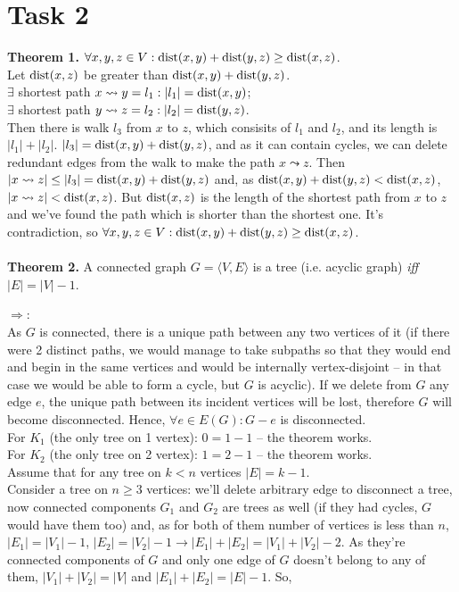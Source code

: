 \documentclass{article}
\begin{document}
	\section*{Task 2}
	\textbf{Theorem 1.} $\forall x,y,z \in  V: \textmd{dist}(x,y)+ \textmd{dist}(y,z) \geq \textmd{dist}(x,z)$.\\
	Let $\textmd{dist}(x,z)$ be greater than $\textmd{dist}(x,y) + \textmd{dist}(y,z)$.\\
	$\exists $ shortest path $x \leadsto y = l_1 : |l_1| = \textmd{dist}(x,y)$;\\
	$\exists $ shortest path $y \leadsto z = l_2: |l_2| = \textmd{dist}(y,z)$.\\
	Then there is walk $l_3$ from $x$ to $z$, which consisits of $l_1$ and $l_2$, and its length is $|l_1| + |l_2|$. $|l_3| = \textmd{dist}(x,y) + \textmd{dist}(y,z)$, and as it can contain cycles, we can delete redundant edges from the walk to make the path $x \leadsto z$. Then $|x \leadsto z| \leq |l_3| = \textmd{dist}(x,y) + \textmd{dist}(y,z)$ and, as $\textmd{dist}(x,y) + \textmd{dist}(y,z) < \textmd{dist}(x,z)$, $|x \leadsto z| < \textmd{dist}(x,z)$. But $\textmd{dist}(x,z)$ is the length of the shortest path from $x$ to $z$ and we've found the path which is shorter than the shortest one. It's contradiction, so $\forall x,y,z \in  V: \textmd{dist}(x,y)+ \textmd{dist}(y,z) \geq \textmd{dist}(x,z)$.\\\\
	\textbf{Theorem 2.} A connected graph $G = \langle V, E \rangle$ is a tree (i.e. acyclic graph) \textit{iff} $|E| = |V| - 1$.\par
	$\Longrightarrow$:\\
	As $G$ is connected, there is a unique path between any two vertices of it (if there were 2 distinct paths, we would manage to take subpaths so that they would end and begin in the same vertices and would be internally vertex-disjoint -- in that case we would be able to form a cycle, but $G$ is acyclic). If we delete from $G$ any edge $e$, the unique path between its incident vertices will be lost, therefore $G$ will become disconnected. Hence, $\forall e \in E(G): G - e$ is disconnected.\\
	For $K_1$ (the only tree on 1 vertex): $0 = 1 - 1$ -- the theorem works.\\
	For $K_2$ (the only tree on 2 vertex): $1 = 2 - 1$ -- the theorem works.\\
	Assume that for any tree on $k < n$ vertices $|E| = k - 1$.\\
	Consider a tree on $n \geq 3$ vertices: we'll delete arbitrary edge to disconnect a tree, now connected components $G_1$ and $G_2$ are trees as well (if they had cycles, $G$ would have them too) and, as for both of them number of vertices is less than $n$, $|E_1| = |V_1| - 1$, $|E_2| = |V_2| - 1 \rightarrow |E_1| + |E_2| = |V_1| +|V_2|- 2$. As they're connected components of $G$ and only one edge of $G$ doesn't belong to any of them, $|V_1| +|V_2| = |V|$ and $|E_1| + |E_2| = |E| - 1$. So,
\end{document}
